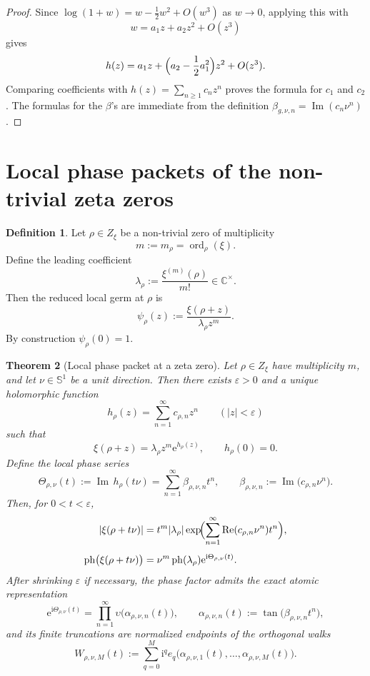 \documentclass[11pt,a4paper]{article}
\numberwithin{equation}{section}
\newtheorem{theorem}{Theorem}[section]
\theoremstyle{definition}
\newtheorem{definition}[theorem]{Definition}
\theoremstyle{remark}
\DeclareMathOperator{\ord}{ord}
\DeclareMathOperator{\Rea}{Re}
\DeclareMathOperator{\Ima}{Im}
\newcommand{\CC}{\mathbb C}
\newcommand{\Sph}{\mathbb S^1}
\newcommand{\ph}{\operatorname{ph}}
\newcommand{\e}{\mathrm e}
\newcommand{\ii}{\mathrm i}
\begin{document}
\begin{proof}
Since $\log(1+w)=w-\frac12 w^2+O(w^3)$ as $w\to0$, applying this with
\[
w=a_1 z+a_2 z^2+O(z^3)
\]
gives
\[
h(z)=a_1 z+\Bigl(a_2-\frac12 a_1^2\Bigr)z^2+O(z^3).
\]
Comparing coefficients with $h(z)=\sum_{n\ge1} c_n z^n$ proves the formula for $c_1$ and $c_2$.  The formulas for the $\beta$'s are immediate from the definition $\beta_{g,\nu,n}=\Ima(c_n\nu^n)$.
\end{proof}

\section{Local phase packets of the non-trivial zeta zeros}

\begin{definition}
Let $\rho\in Z_\xi$ be a non-trivial zero of multiplicity
\[
m:=m_\rho=\ord_\rho(\xi).
\]
Define the leading coefficient
\[
\lambda_\rho:=\frac{\xi^{(m)}(\rho)}{m!}\in\CC^\times.
\]
Then the reduced local germ at $\rho$ is
\[
\psi_\rho(z):=\frac{\xi(\rho+z)}{\lambda_\rho z^m}.
\]
By construction $\psi_\rho(0)=1$.
\end{definition}

\begin{theorem}[Local phase packet at a zeta zero]\label{P4:thm:local-phase-packet}
Let $\rho\in Z_\xi$ have multiplicity $m$, and let $\nu\in\Sph$ be a unit direction.  Then there exists $\varepsilon>0$ and a unique holomorphic function
\[
h_\rho(z)=\sum_{n=1}^{\infty} c_{\rho,n} z^n
\qquad (|z|<\varepsilon)
\]
such that
\[
\xi(\rho+z)=\lambda_\rho z^m \e^{h_\rho(z)},
\qquad h_\rho(0)=0.
\]
Define the local phase series
\[
\Theta_{\rho,\nu}(t):=\Ima\,h_\rho(t\nu)
=\sum_{n=1}^{\infty}\beta_{\rho,\nu,n} t^n,
\qquad
\beta_{\rho,\nu,n}:=\Ima\bigl(c_{\rho,n}\nu^n\bigr).
\]
Then, for $0<t<\varepsilon$,
\begin{align*}
|\xi(\rho+t\nu)|
&=t^m |\lambda_\rho| \exp\!\Bigl(\sum_{n=1}^{\infty}\Rea(c_{\rho,n}\nu^n)t^n\Bigr),\\[4pt]
\ph\bigl(\xi(\rho+t\nu)\bigr)
&=\nu^m\ph(\lambda_\rho)\e^{\ii\Theta_{\rho,\nu}(t)}.
\end{align*}
After shrinking $\varepsilon$ if necessary, the phase factor admits the exact atomic representation
\[
\e^{\ii\Theta_{\rho,\nu}(t)}
=\prod_{n=1}^{\infty}\upsilon\bigl(\alpha_{\rho,\nu,n}(t)\bigr),
\qquad
\alpha_{\rho,\nu,n}(t):=\tan\bigl(\beta_{\rho,\nu,n}t^n\bigr),
\]
and its finite truncations are normalized endpoints of the orthogonal walks
\[
W_{\rho,\nu,M}(t):=
\sum_{q=0}^M \ii^q e_q\bigl(\alpha_{\rho,\nu,1}(t),\dots,\alpha_{\rho,\nu,M}(t)\bigr).
\]
\end{theorem}
\end{document}
